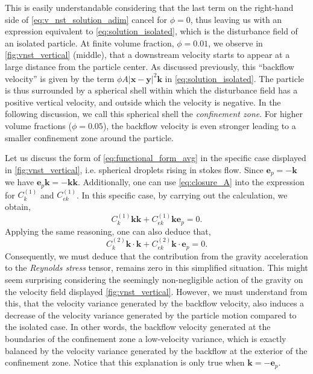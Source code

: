 This is easily understandable considering that the last term on the right-hand side of \ref{eq:v_nst_solution_adim} cancel for $\phi=0$, thus leaving us with an expression equivalent to \ref{eq:solution_isolated}, which is the disturbance field of an isolated particle. 
At finite volume fraction, $\phi =0.01$, we  observe in \ref{fig:vnst_vertical} (middle), that a downstream velocity starts to appear at a large distance from the particle center.  
As discussed previously, this ``backflow velocity'' is given by the term $\phi A |\textbf{x}- \textbf{y}|^2 \textbf{k}$ in \ref{eq:solution_isolated}.
The particle is thus surrounded by a spherical shell within which the disturbance field has a positive vertical velocity, and outside which the velocity is negative.
In the following discussion, we call this spherical shell the \textit{confinement zone}.   
For higher volume fractions ($\phi = 0.05$), the backflow velocity is even stronger leading to a smaller confinement zone around the particle. 

Let us discuss the form of \ref{eq:functional_form_avg} in the specific case displayed in \ref{fig:vnst_vertical}, i.e. spherical droplets rising in stokes flow. 
Since $\textbf{e}_p = - \textbf{k}$ we have $\textbf{e}_p\textbf{k} = - \textbf{kk}$. 
Additionally, one can use \ref{eq:closure_A} into the expression for $C_k^{(1)}$ and $C_{ek}^{(1)}$. 
In this specific case, by carrying out the calculation, we obtain, 
\begin{equation}
    C_k^{(1)} \textbf{kk} + C_{ek}^{(1)} \textbf{ke}_p
    = 0. 
    \label{eq:cancelation1}
\end{equation}
Applying the same reasoning, one can also deduce that, 
\begin{equation}
    C_k^{(2)} \textbf{k}\cdot \textbf{k} + C_{ek}^{(2)} \textbf{k}\cdot \textbf{e}_p
    = 0. 
    \label{eq:cancelation2}
\end{equation}
Consequently, we must deduce that the contribution from the gravity acceleration to the \textit{Reynolds stress} tensor, remains zero in this simplified situation. 
This might seem surprising considering the seemingly non-negligible action of the gravity on the velocity field displayed \ref{fig:vnst_vertical}. 
However, we must understand from this, that the velocity variance generated by the backflow velocity, also induces a decrease of the velocity variance generated by the particle motion compared to the isolated case.
In other words, the backflow velocity generated at the boundaries of the confinement zone a low-velocity variance, which is exactly balanced by the velocity variance generated by the backflow at the exterior of the confinement zone.    
Notice that this explanation is only true when $\textbf{k} = - \textbf{e}_p$. 

